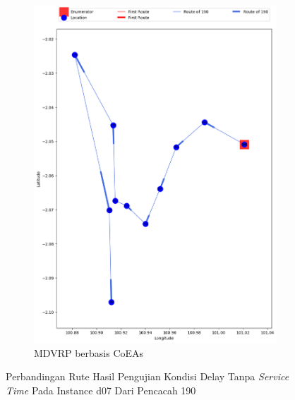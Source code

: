 \begin{figure}[H]
	\centering
	\begin{subfigure}[t]{\textwidth}
		\centering
		\includegraphics[width=\textwidth]{Resources/Images/delayed_7/real_m15_n100_delayed_7_190_coes}
		\caption{MDVRP berbasis CoEAs}
		\label{fig:real_m15_n100_delayed_7_190_coes}
	\end{subfigure}
	\caption{Perbandingan Rute Hasil Pengujian Kondisi Delay Tanpa \textit{Service Time} Pada Instance d07 Dari Pencacah 190}
	\label{fig:real_m15_n100_delayed_7_190}
\end{figure}


